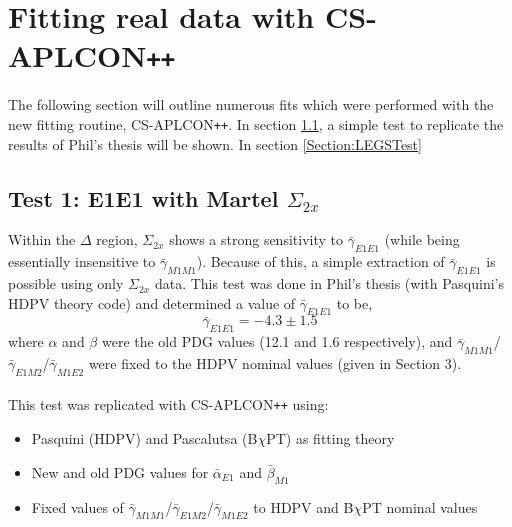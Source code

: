 \documentclass[]{article}
\begin{document}
\newpage
\section{Fitting real data with CS-APLCON\texttt{++}}

The following section will outline numerous fits which were performed with the new fitting routine, CS-APLCON\texttt{++}. In section \ref{Section:PhilTest}, a simple test to replicate the results of Phil's thesis will be shown. In section \ref{Section:LEGSTest}

\subsection{Test 1: E1E1 with Martel $\Sigma_{2x}$}\label{Section:PhilTest}

Within the $\Delta$ region, $\Sigma_{2x}$ shows a strong sensitivity to $\bar{\gamma}_{E1E1}$ (while being essentially insensitive to $\bar{\gamma}_{M1M1}$). Because of this, a simple extraction of $\bar{\gamma}_{E1E1}$ is possible using only $\Sigma_{2x}$ data. This test was done in Phil's thesis (with Pasquini's HDPV theory code) and determined a value of $\bar{\gamma}_{E1E1}$ to be,
%
\begin{equation}
\bar{\gamma}_{E1E1} = -4.3 \pm 1.5 
\end{equation}
%
where $\alpha$ and $\beta$ were the old PDG values (12.1 and 1.6 respectively), and $\bar{\gamma}_{M1M1}$/$\bar{\gamma}_{E1M2}$/$\bar{\gamma}_{M1E2}$ were fixed to the HDPV nominal values (given in Section 3). \\

\noindent \\This test was replicated with CS-APLCON\texttt{++} using:
\begin{itemize}
	\item Pasquini (HDPV) and Pascalutsa (B$\chi$PT) as fitting theory
	\item New and old PDG values for $\bar{\alpha}_{E1}$ and $\bar{\beta}_{M1}$
	\item Fixed values of $\bar{\gamma}_{M1M1}$/$\bar{\gamma}_{E1M2}$/$\bar{\gamma}_{M1E2}$ to HDPV and B$\chi$PT nominal values
\end{itemize}
\end{document}
